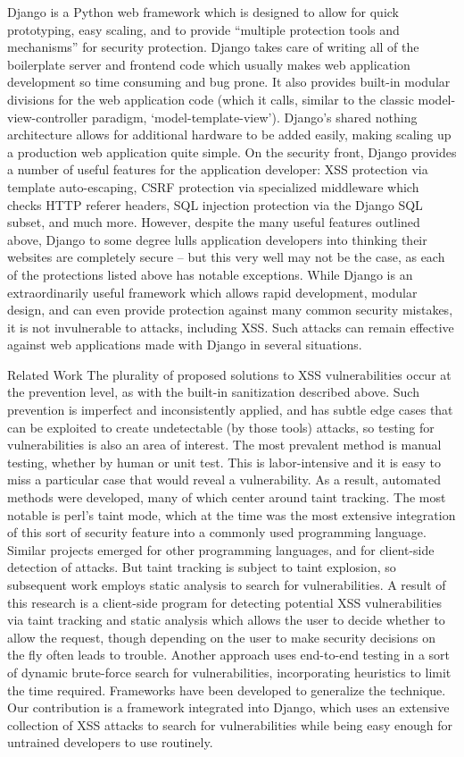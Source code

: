 \documentclass{sigplanconf}
\begin{document}
Django is a Python web framework which is designed to allow for quick prototyping, easy scaling, and to provide “multiple protection tools and mechanisms” for security protection.  Django takes care of writing all of the boilerplate server and frontend code which usually makes web application development so time consuming and bug prone.  It also provides built-in modular divisions for the web application code (which it calls, similar to the classic model-view-controller paradigm, ‘model-template-view’).  Django’s shared nothing architecture allows for additional hardware to be added easily, making scaling up a production web application quite simple.  On the security front, Django provides a number of useful features for the application developer: XSS protection via template auto-escaping, CSRF protection via specialized middleware which checks HTTP referer headers, SQL injection protection via the Django SQL subset, and much more. However, despite the many useful features outlined above, Django to some degree lulls application developers into thinking their websites are completely secure -- but this very well may not be the case, as each of the protections listed above has notable exceptions.
While Django is an extraordinarily useful framework which allows rapid development, modular design, and can even provide protection against many common security mistakes, it is not invulnerable to attacks, including XSS.  Such attacks can remain effective against web applications made with Django in several situations. 

Related Work
The plurality of proposed solutions to XSS vulnerabilities occur at the prevention level, as with the built-in sanitization described above. Such prevention is imperfect and inconsistently applied, and has subtle edge cases that can be exploited to create undetectable (by those tools) attacks, so testing for vulnerabilities is also an area of interest. The most prevalent method is manual testing, whether by human or unit test. This is labor-intensive and it is easy to miss a particular case that would reveal a vulnerability.
As a result, automated methods were developed, many of which center around taint tracking. The most notable is perl’s taint mode, which at the time was the most extensive integration of this sort of security feature into a commonly used programming language. Similar projects emerged for other programming languages, and for client-side detection of attacks. But taint tracking is subject to taint explosion, so subsequent work employs static analysis to search for vulnerabilities. A result of this research is a client-side program for detecting potential XSS vulnerabilities via taint tracking and static analysis which allows the user to decide whether to allow the request, though depending on the user to make security decisions on the fly often leads to trouble. 
Another approach uses end-to-end testing in a sort of dynamic brute-force search for vulnerabilities, incorporating heuristics to limit the time required. Frameworks have been developed to generalize the technique. 
Our contribution is a framework integrated into Django, which uses an extensive collection of XSS attacks to search for vulnerabilities while being easy enough for untrained developers to use routinely. 
\end{document}
